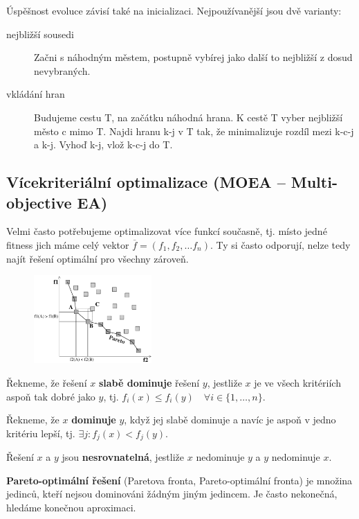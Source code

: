 Úspěšnost evoluce závisí také na inicializaci. Nejpoužívanější jsou dvě varianty:
\begin{description}
	
	
	\item[nejbližší sousedi] Začni s náhodným městem, postupně vybírej jako další to nejbližší z dosud nevybraných.
	\item[vkládání hran] Budujeme cestu T, na začátku náhodná hrana. K cestě T vyber nejbližší město c mimo T. Najdi hranu k-j v T tak, že minimalizuje rozdíl mezi k-c-j a k-j. Vyhoď k-j, vlož k-c-j do T.
\end{description}

\subsection{Vícekriteriální optimalizace (MOEA -- Multi-objective EA)}
Velmi často potřebujeme optimalizovat více funkcí současně, tj. místo jedné fitness jich máme celý vektor $\overline{f} = (f_1, f_2, \dots f_n)$. Ty si často odporují, nelze tedy najít řešení optimální pro všechny zároveň.

\begin{figure}
	\centering
	
	\includegraphics[width=0.4\textwidth]{img/pareto.png}
\end{figure}

Řekneme, že řešení $x$ \textbf{slabě dominuje} řešení $y$, jestliže $x$ je ve všech kritériích aspoň tak dobré jako $y$, tj. $f_i(x) \leq f_i(y)\quad \forall i \in \{1,\dots,n\}$. 

Řekneme, že $x$ \textbf{dominuje} $y$, když jej slabě dominuje a navíc je aspoň v jedno kritériu lepší, tj. $\exists j: f_j(x) < f_j(y)$. 

Řešení $x$ a $y$ jsou \textbf{nesrovnatelná}, jestliže $x$ nedominuje $y$ a $y$ nedominuje $x$.

\textbf{Pareto-optimální řešení} (Paretova fronta, Pareto-optimální fronta) je množina jedinců, kteří nejsou dominováni žádným jiným jedincem. Je často nekonečná, hledáme konečnou aproximaci.

